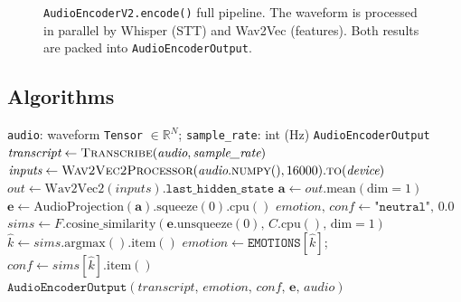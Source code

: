 \documentclass[12pt,a4paper]{article}
\theoremstyle{definition}
\theoremstyle{remark}
\begin{document}
\begin{figure}[H]
\caption{\texttt{AudioEncoderV2.encode()} full pipeline. The waveform is
processed in parallel by Whisper (STT) and Wav2Vec (features). Both results
are packed into \texttt{AudioEncoderOutput}.}
\label{fig:audioencv2}
\end{figure}

\subsection{Algorithms}

\begin{algorithm}[H]
\caption{\texttt{AudioEncoderV2.encode}(audio, sample\_rate)}
\label{alg:audioencode}
\begin{algorithmic}[1]
\Require \texttt{audio}: waveform \texttt{Tensor} $\in \mathbb{R}^N$;
         \texttt{sample\_rate}: int (Hz)
\Ensure \texttt{AudioEncoderOutput}
\State $\textit{transcript} \gets \textsc{Transcribe}(\textit{audio}, \textit{sample\_rate})$
\State $\textit{inputs} \gets \textsc{Wav2Vec2Processor}(\textit{audio}.\textsc{numpy}(),
       16000).\textsc{to}(\textit{device})$
\State $\textit{out} \gets \text{Wav2Vec2}(\textit{inputs}).\texttt{last\_hidden\_state}$
       \Comment{$[1, T, 768]$}
\State $\mathbf{a} \gets \textit{out}.\text{mean}(\text{dim}=1)$
\State $\mathbf{e} \gets \text{AudioProjection}(\mathbf{a}).\text{squeeze}(0).\text{cpu}()$
\State $\textit{emotion},\, \textit{conf} \gets \texttt{"neutral"},\, 0.0$
  \State $\textit{sims} \gets F.\text{cosine\_similarity}(\mathbf{e}.\text{unsqueeze}(0),\, C.\text{cpu}(),\, \text{dim}=1)$
         \Comment{$[8]$}
  \State $\hat{k} \gets \textit{sims}.\text{argmax}().\text{item}()$
  \State $\textit{emotion} \gets \texttt{EMOTIONS}[\hat{k}]$;
         $\textit{conf} \gets \textit{sims}[\hat{k}].\text{item}()$
\EndIf
\State \Return $\texttt{AudioEncoderOutput}(\textit{transcript},\,
               \textit{emotion},\, \textit{conf},\, \mathbf{e},\, \textit{audio})$
\end{algorithmic}
\end{algorithm}
\end{document}
